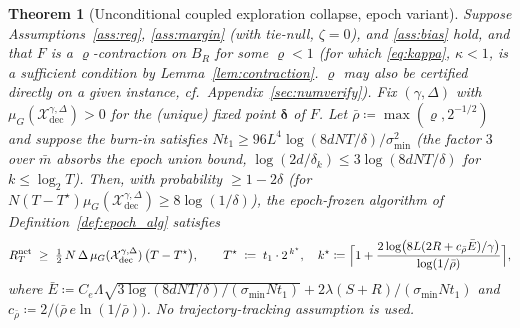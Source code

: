 \documentclass[11pt]{article}
\newtheorem{theorem}{Theorem}[section]
\begin{document}
\begin{theorem}[Unconditional coupled exploration collapse, epoch
variant]\label{thm:cec_epoch}
Suppose Assumptions~\ref{ass:reg}, \ref{ass:margin} (with tie-null,
$\zeta=0$), and \ref{ass:bias} hold, and that $F$ is a
$\varrho$-contraction on $B_R$ for some $\varrho<1$
(for which \eqref{eq:kappa}, $\kappa<1$, is a sufficient condition by
Lemma~\ref{lem:contraction}. $\varrho$ may also be certified directly
on a given instance, cf.\ Appendix~\ref{sec:numverify}).
Fix $(\gamma,\Delta)$ with
$\mu_G(\mathcal X_{\mathrm{dec}}^{\gamma,\Delta})>0$ for the (unique)
fixed point $\bm\delta$ of $F$.  Let
$\bar\rho\coloneqq\max(\varrho,2^{-1/2})$ and suppose the burn-in
satisfies $Nt_1\geq 96L^4\log(8dNT/\delta)/\sigma_{\min}^2$
(the factor $3$ over $\bar m$ absorbs the epoch union bound,
$\log(2d/\delta_k)\leq 3\log(8dNT/\delta)$ for $k\leq\log_2T$).
Then, with probability $\geq 1-2\delta$ (for
$N(T-T^\star)\mu_G(\mathcal X_{\mathrm{dec}}^{\gamma,\Delta})\geq
8\log(1/\delta)$), the epoch-frozen algorithm of
Definition~\ref{def:epoch_alg} satisfies
\begin{equation}
R_T^{\mathrm{net}}\;\geq\;
\tfrac12\,N\,\Delta\,
\mu_G(\mathcal X_{\mathrm{dec}}^{\gamma,\Delta})\,
\bigl(T-T^\star\bigr),
\qquad
T^\star\;\coloneqq\;
t_1\cdot 2^{\,k^\star},\quad
k^\star\coloneqq\Bigl\lceil
1+\frac{2\log\bigl(8L(2R+c_{\bar\rho}\bar E)/\gamma\bigr)}
{\log(1/\bar\rho)}\Bigr\rceil,
\label{eq:cec_epoch}
\end{equation}
where
$\bar E\coloneqq
C_e\Lambda\sqrt{3\log(8dNT/\delta)/(\sigma_{\min}Nt_1)}
+2\lambda(S+R)/(\sigma_{\min}Nt_1)$
and
$c_{\bar\rho}\coloneqq 2/\bigl(\bar\rho\, e\ln(1/\bar\rho)\bigr)$.
No trajectory-tracking assumption is used.
\end{theorem}
\end{document}
